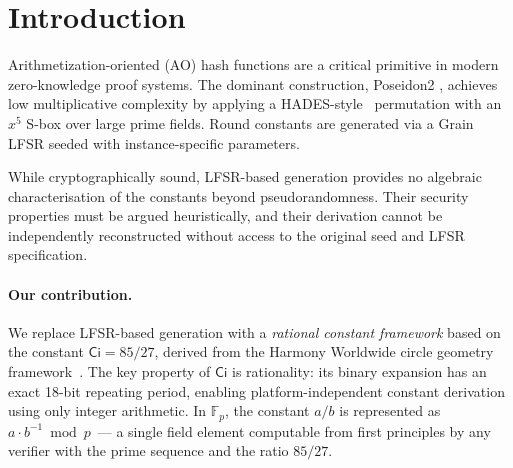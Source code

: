 \documentclass[preprint]{iacrtrans}
\newcommand{\Ci}{\ensuremath{\mathsf{Ci}}}
\newcommand{\GF}[1]{\ensuremath{\mathbb{F}_{#1}}}
\begin{document}
\begin{abstract}
Additionally, we demonstrate that the tHz wavelengths of elements across
the resonance matrix produce natural MDS matrices exhaustively: every row,
every triangle arrangement, and every supported width — 160 combinations
in total, all passing without augmentation ($t \in \{2,3,4,6\}$), across
both BN254 and BLS12-381 fields. The four triangle arrangements (cols 1,5,9
/ 2,6,10 / 3,7,11 / 4,8,12) also provide a 2-bit domain separator at zero
cost. The complete resonance matrix encodes a valid cryptographic diffusion
layer directly.

\end{abstract}

\section{Introduction}

Arithmetization-oriented (AO) hash functions are a critical primitive in
modern zero-knowledge proof systems. The dominant construction, Poseidon2
\cite{GKRRS23}, achieves low multiplicative complexity by applying a
HADES-style~\cite{GLRRS20} permutation with an $x^5$ S-box over large prime
fields. Round constants are generated via a Grain LFSR seeded with
instance-specific parameters.

While cryptographically sound, LFSR-based generation provides no algebraic
characterisation of the constants beyond pseudorandomness. Their security
properties must be argued heuristically, and their derivation cannot be
independently reconstructed without access to the original seed and LFSR
specification.

\paragraph{Our contribution.} We replace LFSR-based generation with a
\emph{rational constant framework} based on the constant $\Ci = 85/27$,
derived from the Harmony Worldwide circle geometry framework~\cite{HW26}. The
key property of $\Ci$ is rationality: its binary expansion has an exact
18-bit repeating period, enabling platform-independent constant derivation
using only integer arithmetic. In $\GF{p}$, the constant $a/b$ is represented
as $a \cdot b^{-1} \bmod p$~--- a single field element computable from first
principles by any verifier with the prime sequence and the ratio $85/27$.
\end{document}
